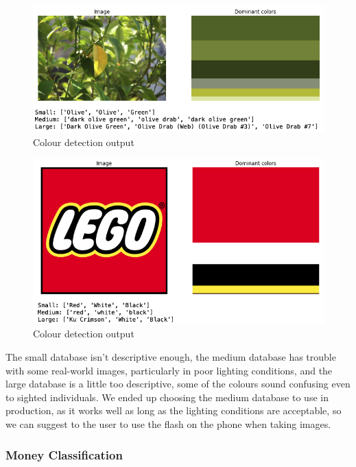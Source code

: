 \documentclass[a4paper,11pt]{article}
\begin{document}
\begin{figure}[H]
\centering
\includegraphics[scale=0.6]{img/cv/colour_detection/colour_detection_3.png}
\caption{Colour detection output}
\label{fig:color-detection-output-3}
\end{figure}


\begin{figure}[H]
\centering
\includegraphics[scale=0.6]{img/cv/colour_detection/colour_detection_4.png}
\caption{Colour detection output}
\label{fig:color-detection-output-4}
\end{figure}

The small database isn't descriptive enough, the medium database has trouble with some real-world images, particularly in poor lighting conditions, and the large database is a little too descriptive, some of the colours sound confusing even to sighted individuals. We ended up choosing the medium database to use in production, as it works well as long as the lighting conditions are acceptable, so we can suggest to the user to use the flash on the phone when taking images.


\subsubsection{Money Classification}
\end{document}

